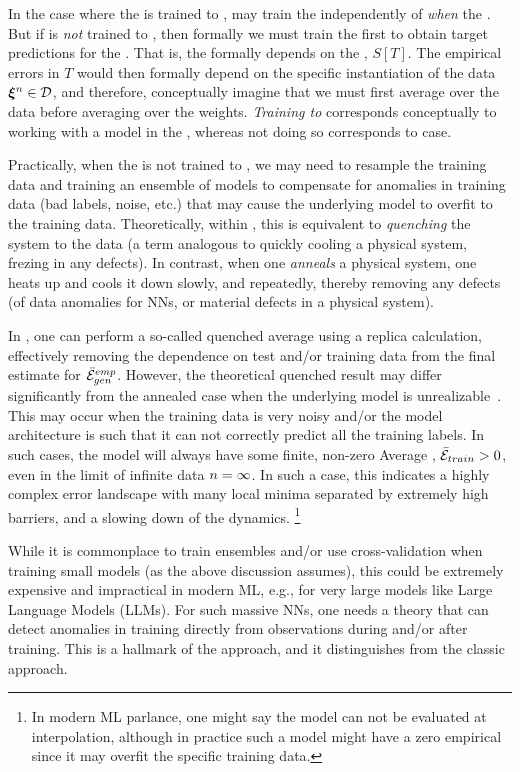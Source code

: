 In the case where the \Teacher is trained to \Interpolation, may train the \Student 
independently of \emph{when} the \Teacher.  
But if \Teacher is \emph{not} trained to \Interpolation, then formally we must train the \Teacher
first to obtain target predictions for the \Student.  That is, the \Student formally
depends on the \Teacher, $S[T]$.
The empirical errors in $T$ would then formally depend on the specific instantiation of the data  $\boldsymbol{\xi}^{n}\in\mathcal{D}$,
and therefore, conceptually imagine that we must first average over the data
before averaging over the weights.
\emph{Training to \Interpolation} corresponds conceptually to working with a model
in the \AnnealedApproximation, whereas not doing so corresponds to \Quenched case.

Practically, when the \Teacher is not trained to \Interpolation, 
we may need to resample the training data and training an ensemble of models to compensate for anomalies in training data (bad labels, noise, etc.) that may cause the underlying model to overfit to the training data.
Theoretically, within \SMOG, this is equivalent to \emph{quenching} the system to the data (a term analogous to quickly cooling a physical system, frezing in any defects).
In contrast, when one \emph{anneals} a physical system, one heats up and cools it down slowly, and repeatedly, thereby removing any defects (of data anomalies for NNs, or material defects in a physical system).

In \STATMECH, one can perform a so-called quenched average using a replica calculation,
effectively removing the dependence on test and/or training data
from the final estimate for $\bar{\mathcal{E}}^{emp}_{gen}$.
However, the theoretical quenched result may differ significantly from the annealed case when the underlying model is unrealizable~\cite{SST92}. 
This may occur when the training data is very noisy and/or the model architecture is such that it can not correctly predict all the training labels.
In such cases, the model will always have some finite, non-zero Average \TrainingError, $\bar{\mathcal{E}}_{train} > 0$,
even in the \LargeN limit of infinite data $n=\infty$. In such a case, this indicates
a highly complex error landscape with many local minima separated by extremely high barriers,
and a slowing down of the dynamics.%
\footnote{In modern ML parlance, one might say the model can not be evaluated at interpolation, although 
in practice such a model might have a zero empirical \TrainingError since it may overfit the specific training data.}

While it is commonplace to train ensembles and/or use cross-validation when training small models (as the above discussion assumes),
this could be extremely expensive and impractical in modern ML, e.g., for very large models like Large Language Models (LLMs).
For such massive NNs, one needs a theory that can detect anomalies in training directly from observations during and/or after training.
This is a hallmark of the \SETOL approach, and it distinguishes \SETOL from the classic \STATMECH approach.

